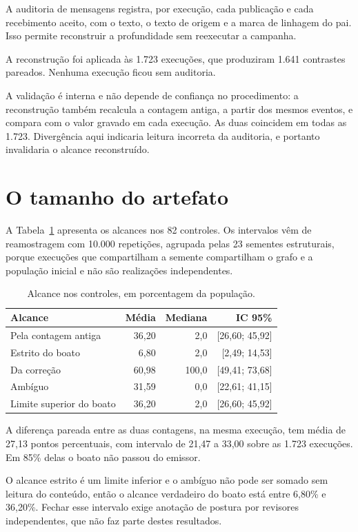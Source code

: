 A auditoria de mensagens registra, por execução, cada publicação e cada
recebimento aceito, com o texto, o texto de origem e a marca de linhagem do
pai. Isso permite reconstruir a profundidade sem reexecutar a campanha.

A reconstrução foi aplicada às 1.723 execuções, que produziram 1.641 contrastes
pareados. Nenhuma execução ficou sem auditoria.

A validação é interna e não depende de confiança no procedimento: a
reconstrução também recalcula a contagem antiga, a partir dos mesmos eventos, e
compara com o valor gravado em cada execução. As duas coincidem em todas as
1.723. Divergência aqui indicaria leitura incorreta da auditoria, e portanto
invalidaria o alcance reconstruído.

\section{O tamanho do artefato}

A Tabela~\ref{tab:alcances} apresenta os alcances nos 82 controles. Os
intervalos vêm de reamostragem com 10.000 repetições, agrupada pelas 23
sementes estruturais, porque execuções que compartilham a semente compartilham
o grafo e a população inicial e não são realizações independentes.

\begin{table}[htbp]
\centering
\caption{Alcance nos controles, em porcentagem da população.}
\label{tab:alcances}
\begin{tabular}{lrrr}
\toprule
Alcance & Média & Mediana & IC 95\% \\
\midrule
Pela contagem antiga      & 36,20 & 2,0   & [26,60; 45,92] \\
Estrito do boato          &  6,80 & 2,0   & [2,49; 14,53] \\
Da correção               & 60,98 & 100,0 & [49,41; 73,68] \\
Ambíguo                   & 31,59 & 0,0   & [22,61; 41,15] \\
Limite superior do boato  & 36,20 & 2,0   & [26,60; 45,92] \\
\bottomrule
\end{tabular}
\end{table}

A diferença pareada entre as duas contagens, na mesma execução, tem média de
27,13 pontos percentuais, com intervalo de 21,47 a 33,00 sobre as 1.723
execuções. Em 85\% delas o boato não passou do emissor.

O alcance estrito é um limite inferior e o ambíguo não pode ser somado sem
leitura do conteúdo, então o alcance verdadeiro do boato está entre 6,80\% e
36,20\%. Fechar esse intervalo exige anotação de postura por revisores
independentes, que não faz parte destes resultados.

